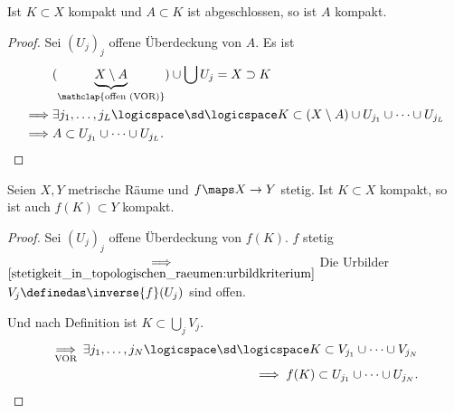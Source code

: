 \begin{lemma}\label{abgeschlossene_teilmenge_kompakter_menge_ist_kompakt}
    Ist \( K\subset X\) kompakt und \( A\subset K\) ist abgeschlossen, so ist \( A\) kompakt.
\end{lemma}
\begin{proof}
    Sei \( (U_j)_j\) offene Überdeckung von \( A\). Es ist
    \begin{align*}
        &(\underbrace{X\setminus A}_{\mathclap{\text{offen (VOR)}}})\cup \bigcup U_j=X\supset K\\
        \implies &\exists j_1,\ldots, j_L\logicspace\text{\sd}\logicspace K\subset (X\setminus A)\cup U_{j_1}\cup \cdots \cup U_{j_L}\\
        \implies &A\subset U_{j_1}\cup \cdots \cup U_{j_L}.  
    \end{align*}
    
\end{proof}


\begin{satz}\label{kompakte_menge_stetiges_bild_kompakt}
    Seien \( X,Y\) metrische Räume und \( f\maps X\to Y\) stetig. Ist \( K\subset X\) kompakt, so ist auch \( f(K)\subset Y\) kompakt. 
\end{satz}
\begin{proof}
    Sei \( (U_j)_j\) offene Überdeckung von \( f(K)\). \( f\) stetig \( \underset{\ref{stetigkeit_in_topologischen_raeumen:urbildkriterium}}{\implies}\) Die Urbilder \( V_j \definedas \inverse{f}(U_j)\) sind offen.
    
    Und nach Definition ist \( K\subset \bigcup_j V_j\).
    \begin{align*}
        \underset{\text{VOR}}{\implies} \exists j_1,\ldots, j_N\logicspace \text{\sd}\logicspace  K\subset V_{j_1}\cup \cdots \cup V_{j_N}\\
        \implies f(K)\subset U_{j_1}\cup \cdots\cup U_{j_N}.
    \end{align*} 
    
\end{proof}

